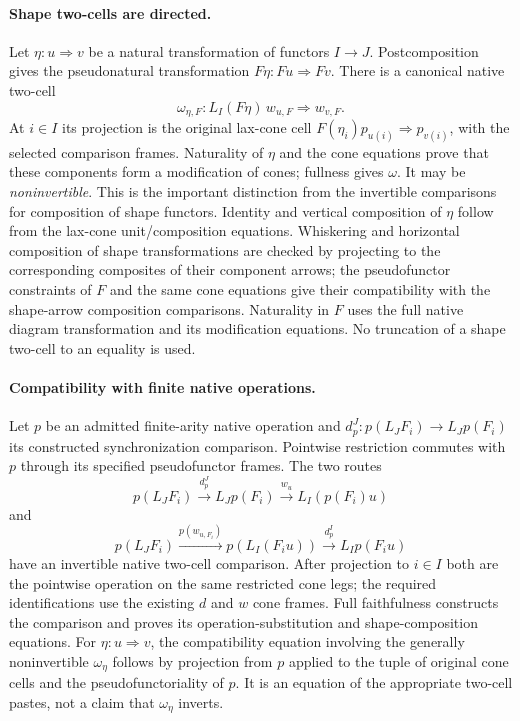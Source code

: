 \documentclass{article}
\begin{document}
\paragraph{Shape two-cells are directed.} Let $\eta:u\Rightarrow v$ be a natural transformation of functors $I\to J$. Postcomposition gives the pseudonatural transformation $F\eta:Fu\Rightarrow Fv$. There is a canonical native two-cell
\[
 \omega_{\eta,F}:L_I(F\eta)\,w_{u,F}\Longrightarrow w_{v,F}.
\]
At $i\in I$ its projection is the original lax-cone cell
$F(\eta_i)p_{u(i)}\Rightarrow p_{v(i)}$, with the selected comparison frames. Naturality of $\eta$ and the cone equations prove that these components form a modification of cones; fullness gives $\omega$. It may be \emph{noninvertible}. This is the important distinction from the invertible comparisons for composition of shape functors. Identity and vertical composition of $\eta$ follow from the lax-cone unit/composition equations. Whiskering and horizontal composition of shape transformations are checked by projecting to the corresponding composites of their component arrows; the pseudofunctor constraints of $F$ and the same cone equations give their compatibility with the shape-arrow composition comparisons. Naturality in $F$ uses the full native diagram transformation and its modification equations. No truncation of a shape two-cell to an equality is used.

\paragraph{Compatibility with finite native operations.} Let $p$ be an admitted finite-arity native operation and $d_p^J:p(L_JF_i)\to L_Jp(F_i)$ its constructed synchronization comparison. Pointwise restriction commutes with $p$ through its specified pseudofunctor frames. The two routes
\[
 p(L_JF_i)\xrightarrow{d_p^J}L_Jp(F_i)
 \xrightarrow{w_u}L_I(p(F_i)u)
\]
and
\[
 p(L_JF_i)\xrightarrow{p(w_{u,F_i})}p(L_I(F_i u))
 \xrightarrow{d_p^I}L_Ip(F_i u)
\]
have an invertible native two-cell comparison. After projection to $i\in I$ both are the pointwise operation on the same restricted cone legs; the required identifications use the existing $d$ and $w$ cone frames. Full faithfulness constructs the comparison and proves its operation-substitution and shape-composition equations. For $\eta:u\Rightarrow v$, the compatibility equation involving the generally noninvertible $\omega_\eta$ follows by projection from $p$ applied to the tuple of original cone cells and the pseudofunctoriality of $p$. It is an equation of the appropriate two-cell pastes, not a claim that $\omega_\eta$ inverts.
\end{document}
